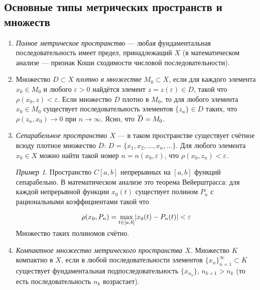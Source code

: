 \documentclass[12pt,a4paper,titlepage,oneside]{book}
\newcommand{\overbar}[1]{\mkern 1.5mu\overline{\mkern-1.5mu#1\mkern-1.5mu}\mkern 1.5mu}
\theoremstyle{definition}
\theoremstyle{plain}
\theoremstyle{break}
\theoremstyle{remark}
\theoremstyle{remark}
\newtheorem*{example}{Пример}
\theoremstyle{remark}
\theoremstyle{remark}
\theoremstyle{plain}
\theoremstyle{plain}
\begin{document}
\subsection*{Основные типы метрических пространств и множеств}

\begin{enumerate}

	\item \textit{Полное метрическое пространство} --- любая фундаментальная последовательность имеет предел, принадлежащий $X$ (в математическом анализе --- признак Коши сходимости числовой последовательности).

	\item Множество $D \subset X$ \textit{плотно в множестве} $ M_0 \subset X$, если для каждого элемента $x_0 \in M_0$ и любого $\varepsilon > 0$ найдётся элемент $z = z(\varepsilon) \in D$, такой что $\rho(x_0, z) < \varepsilon$. Если множество $D$ плотно в $M_0$, то для любого элемента $x_0 \in  M_0$ существует последовательность элементов $\lbrace z_n \rbrace \in D$ таких, что $\rho(z_n, x_0) \to 0$ при $n \to \infty$. Ясно, что $\overbar{D} = M_0$.

	\item \textit{Сепарабельное пространство $X$} --- в таком пространстве существует счётное всюду плотное множество $D$: $D=\lbrace x_1,x_2,\ldots,x_n,\ldots \rbrace$. Для любого элемента $x_0 \in X$ можно найти такой номер $n = n(x_0,\varepsilon)$, что $\rho(x_0, z_n) < \varepsilon$.

	\begin{example}	
	Пространство $C[a,b]$ непрерывных на $[a,b]$ функций сепарабельно. В математическом анализе это теорема Вейерштрасса: для каждой непрерывной функции $x_0(t)$ существует полином $P_n$ с рациональными коэффициентами такой что
	
	\begin{equation*}
	\rho(x_0, P_n)=\smash{\displaystyle\max_{t \in [a,b]}} |x_0(t)-P_n(t)| < \varepsilon
	\end{equation*}

	Множество таких полиномов счётно.
	\end{example}

	\item \textit{Компактное множество метрического пространства $X$}. Множество $K$ компактно в $X$, если в любой последовательности элементов $\lbrace x_n \rbrace_{n=1}^{\infty} \subset K$ существует фундаментальная подпоследовательность $\lbrace x_{n_k} \rbrace$, $n_{k+1}>n_k$ (то есть последовательность $n_k$ возрастает).

\end{enumerate}
\end{document}
